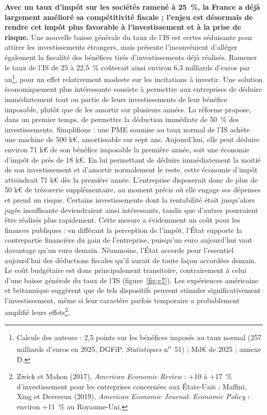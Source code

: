 \documentclass[10pt,a4paper]{article}
\begin{document}
\textbf{Avec un taux d’impôt sur les sociétés ramené à 25~\%, la France a déjà largement amélioré sa compétitivité fiscale ; l’enjeu est désormais de rendre cet impôt plus favorable à l’investissement et à la prise de risque.} Une nouvelle baisse générale du taux de l’IS est certes séduisante pour attirer les investissements étrangers, mais présente l’inconvénient d’alléger également la fiscalité des bénéfices tirés d’investissements déjà réalisés. Ramener le taux de l’IS de 25 à 22,5~\% coûterait ainsi environ 6,3 milliards d’euros par an\footnote{Calculs des auteurs : 2,5 points sur les bénéfices imposés au taux normal (257 milliards d'euros en 2025, DGFiP, \emph{Statistiques} n\textsuperscript{o}~51) ; Md€ de 2025 ; annexe D.}, pour un effet relativement modeste sur les incitations à investir. Une solution économiquement plus intéressante consiste à permettre aux entreprises de déduire immédiatement tout ou partie de leurs investissements de leur bénéfice imposable, plutôt que de les amortir sur plusieurs années. La réforme propose, dans un premier temps, de permettre la déduction immédiate de 50~\% des investissements. Simplifions : une PME soumise au taux normal de l’IS achète une machine de 500 k€, amortissable sur sept ans. Aujourd’hui, elle peut déduire environ 71 k€ de son bénéfice imposable la première année, soit une économie d’impôt de près de 18 k€. En lui permettant de déduire immédiatement la moitié de son investissement et d’amortir normalement le reste, cette économie d’impôt atteindrait 71 k€ dès la première année. L’entreprise disposerait donc de plus de 50 k€ de trésorerie supplémentaire, au moment précis où elle engage ses dépenses et prend un risque. Certains investissements dont la rentabilité était jusqu’alors jugée insuffisante deviendraient ainsi intéressants, tandis que d’autres pourraient être réalisés plus rapidement. Cette mesure a évidemment un coût pour les finances publiques : en différant la perception de l’impôt, l’État supporte la contrepartie financière du gain de l’entreprise, puisqu’un euro aujourd’hui vaut davantage qu’un euro demain. Néanmoins, l’État accorde pour l’essentiel aujourd’hui des déductions fiscales qu’il aurait de toute façon accordées demain. Le coût budgétaire est donc principalement transitoire, contrairement à celui d’une baisse générale du taux de l’IS (figure~\ref{fig:g7}). Les expériences américaine et britannique suggèrent que de tels dispositifs peuvent stimuler significativement l’investissement, même si leur caractère parfois temporaire a probablement amplifié leurs effets\footnote{Zwick et Mahon (2017), \emph{American Economic Review} : +10 à +17~\% d'investissement pour les entreprises concernées aux États-Unis ; Maffini, Xing et Devereux (2019), \emph{American Economic Journal: Economic Policy} : environ +11~\% au Royaume-Uni.}.
\end{document}

